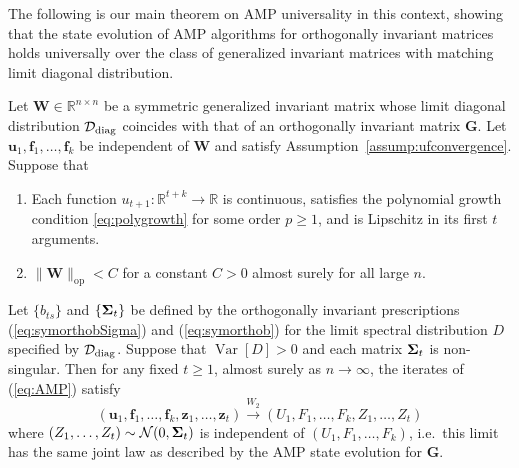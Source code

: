 \documentclass[10pt,reqno]{amsart}
\def\u{\mathbf{u}}
\def\z{\mathbf{z}}
\def\f{\mathbf{f}}
\def\W{\mathbf{W}}
\def\G{\mathbf{G}}
\def\R{\mathbb{R}}
\def\Var{\operatorname{Var}}
\def\op{\mathrm{op}}
\def\Normal{\mathcal{N}}
\def\toWtwo{\overset{W_2}{\to}}
\newcommand{\tdiag}{\mathrm{diag}}
\begin{document}
The following is our main theorem on AMP universality in this context,
showing that the state evolution of AMP algorithms for
orthogonally invariant matrices holds universally over the class of
generalized invariant matrices with matching limit diagonal distribution.

\begin{theorem}\label{thm:syminvariant}
Let $\W \in \R^{n \times n}$ be a symmetric generalized invariant
matrix whose limit diagonal distribution $\cD_\tdiag$ coincides with
that of an orthogonally invariant matrix $\G$.
Let $\u_1,\f_1,\ldots,\f_k$ be independent of $\W$ and satisfy 
Assumption~\ref{assump:ufconvergence}. 
Suppose that
\begin{enumerate}
\item Each function $u_{t+1}:\R^{t+k} \to \R$ is continuous, satisfies the 
polynomial growth condition \eqref{eq:polygrowth} for some order $p \geq 1$, and is
Lipschitz in its first $t$ arguments.
\item $\|\W\|_{\op}<C$ for a constant
$C>0$ almost surely for all large $n$.
\end{enumerate}
Let $\{b_{ts}\}$ and $\{\bm{\Sigma}_t\}$ be defined by the orthogonally invariant
prescriptions (\ref{eq:symorthobSigma}) and (\ref{eq:symorthob}) for the
limit spectral distribution $D$ specified by $\cD_\tdiag$. Suppose that
$\Var[D]>0$ and each matrix $\bm{\Sigma}_t$ is non-singular.
Then for any fixed $t \geq 1$, almost
surely as $n \to \infty$, the iterates of (\ref{eq:AMP}) satisfy
\[(\u_1,\f_1,\ldots,\f_k,\z_1,\ldots,\z_t) \toWtwo
(U_1,F_1,\ldots,F_k,Z_1,\ldots,Z_t)\]
where $(Z_1,\ldots,Z_t) \sim \Normal(0,\bSigma_t)$ is independent of
$(U_1,F_1,\ldots,F_k)$, i.e.\ this limit has the same joint law as
described by the AMP state evolution for $\G$.
\end{theorem}
\end{document}
